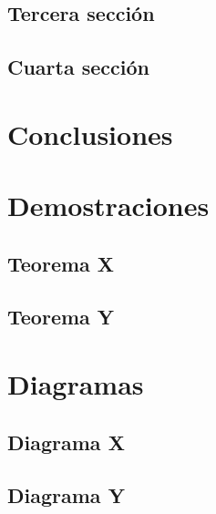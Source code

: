 \documentclass[12pt]{Tesis}
\begin{document}
\section{Tercera sección}
\lipsum[5-6]

\section{Cuarta sección}
\lipsum[7-8]

\chapter{Conclusiones}
\lipsum[1-5]

\appendix

\chapter{Demostraciones}

\section{Teorema X}
\lipsum[1-2]

\section{Teorema Y}
\lipsum[1-2]


\chapter{Diagramas}

\section{Diagrama X}
\lipsum[1-2]

\section{Diagrama Y}
\lipsum[1-2]

\backmatter



\nocite{*}
\end{document}
